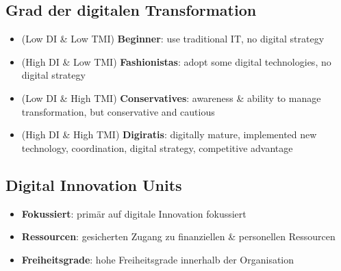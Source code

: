 \documentclass{article}
\begin{document}
\subsection{Grad der digitalen Transformation}
\begin{itemize}
  \item (Low DI \& Low TMI) \textbf{Beginner}: use traditional IT, no digital strategy
  \item (High DI \& Low TMI) \textbf{Fashionistas}: adopt some digital technologies, no digital strategy
  \item (Low DI \& High TMI) \textbf{Conservatives}: awareness \& ability to manage transformation, but conservative and cautious
  \item (High DI \& High TMI) \textbf{Digiratis}: digitally mature, implemented new technology, coordination, digital strategy, competitive advantage
\end{itemize}

\subsection{Digital Innovation Units}
\begin{itemize}
  \item \textbf{Fokussiert}: primär auf digitale Innovation fokussiert
  \item \textbf{Ressourcen}: gesicherten Zugang zu finanziellen \& personellen Ressourcen
  \item \textbf{Freiheitsgrade}: hohe Freiheitsgrade innerhalb der Organisation
\end{itemize}
\end{document}

